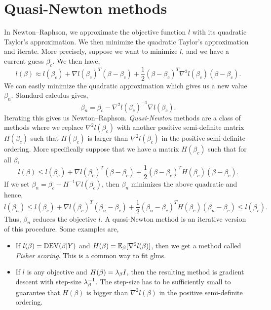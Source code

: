\section{Quasi-Newton methods}
In Newton--Raphson, we approximate the objective function $l$ with its quadratic Taylor's approximation. We then minimize the quadratic Taylor's approximation and iterate. More precisely, suppose we want  to minimize $l$, and we have a  current  guess $\beta_c$. We then  have,
\[l(\beta) \approx l(\beta_c)+\nabla l(\beta_c)^T(\beta-\beta_c)+\frac{1}{2}(\beta-\beta_c)^T\nabla^2 l(\beta_c)(\beta-\beta_c). \]
We can  easily minimize the  quadratic approximation  which gives us a new value $\beta_n$. Standard calculus gives,
\[\beta_n = \beta_c - \nabla^2l(\beta_c)^{-1}\nabla l(\beta_c). \]
Iterating this gives us Newton--Raphson. \emph{Quasi-Newton} methods are a class of methods where we replace $\nabla^2l(\beta_c)$  with another positive semi-definite matrix $H(\beta_c)$ such that $H(\beta_c)$ is larger than $\nabla^2 l(\beta_c)$ in the positive semi-definite ordering. More specifically suppose that we have a matrix $H(\beta_c)$ such that for all $\beta$,
\[l(\beta) \le l(\beta_c)+\nabla l(\beta_c)^T(\beta-\beta_c)+\frac{1}{2}(\beta-\beta_c)^TH(\beta_c)(\beta-\beta_c). \]
If we set $\beta_n = \beta_c-H^{-1}\nabla l(\beta_c)$, then $\beta_n$ minimizes the above quadratic and hence,
\[l(\beta_n) \le l(\beta_c)+\nabla l(\beta_c)^T(\beta_n-\beta_c)+\frac{1}{2}(\beta_n-\beta_c)^TH(\beta_c)(\beta_n-\beta_c) \le   l(\beta_c). \]
Thus, $\beta_n$ reduces the objective  $l$. A quasi-Newton method is an iterative   version of this procedure. Some examples are,
\begin{itemize}
    \item If $l(\beta)=\operatorname{DEV}(\beta|Y)$ and $H(\beta) = {\mathbb{E}}_\beta[\nabla^2 l(\beta)]$, then we get a method called \emph{Fisher scoring}. This is a common way to fit glms.
    \item If $l$ is any objective and $H(\beta) = \lambda_\beta I$, then the resulting method is gradient descent with step-size $\lambda_\beta^{-1}$. The step-size has to be sufficiently small to guarantee that $H(\beta)$ is bigger than $\nabla^2 l(\beta)$ in the positive semi-definite ordering.
\end{itemize}


